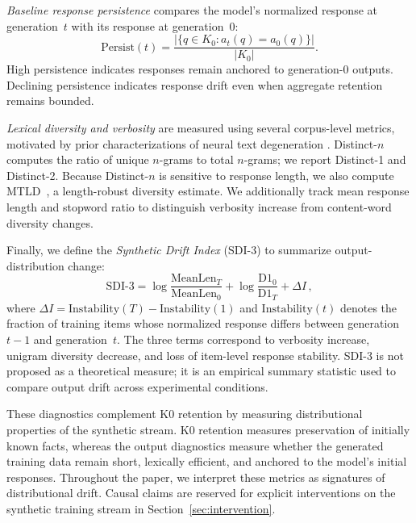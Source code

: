 \documentclass[a4paper,fleqn]{cas-dc}
\begin{document}
\textit{Baseline response persistence} compares the model's normalized response
at generation~$t$ with its response at generation~0:
\begin{equation}\label{eq:persistence}
    \mathrm{Persist}(t) =
    \frac{|\{q \in K_0 : a_t(q) = a_0(q)\}|}{|K_0|}.
\end{equation}
High persistence indicates responses remain anchored to generation-0 outputs.
Declining persistence indicates response drift even when aggregate retention
remains bounded.

\textit{Lexical diversity and verbosity} are measured using several corpus-level
metrics, motivated by prior characterizations of neural text degeneration
\citep{holtzman2020}. Distinct-$n$~\citep{li2016} computes the ratio of unique
$n$-grams to
total $n$-grams; we report Distinct-1 and Distinct-2. Because Distinct-$n$ is
sensitive to response length, we also compute
MTLD~\citep{mccarthy2010}, a length-robust diversity estimate. We additionally
track mean response length and stopword ratio to distinguish verbosity increase
from content-word diversity changes.

Finally, we define the \textit{Synthetic Drift Index} (SDI-3) to summarize
output-distribution change:
\begin{equation}\label{eq:sdi}
    \mathrm{SDI\text{-}3} =
    \log\frac{\mathrm{MeanLen}_T}{\mathrm{MeanLen}_0}
    + \log\frac{\mathrm{D1}_0}{\mathrm{D1}_T}
    + \Delta I\,,
\end{equation}
where $\Delta I = \mathrm{Instability}(T) -
\mathrm{Instability}(1)$ and $\mathrm{Instability}(t)$ denotes the fraction of
training items whose normalized response differs between generation~$t{-}1$ and
generation~$t$. The three terms correspond to verbosity increase, unigram
diversity decrease, and loss of item-level response stability. SDI-3 is not
proposed as a theoretical measure; it is an empirical summary statistic used to
compare output drift across experimental conditions.

These diagnostics complement K0 retention by measuring distributional properties
of the synthetic stream. K0 retention measures preservation of initially known
facts, whereas the output diagnostics measure whether the generated training
data remain short, lexically efficient, and anchored to the model's initial
responses. Throughout the paper, we interpret these metrics as signatures of
distributional drift. Causal claims are reserved for explicit interventions on
the synthetic training stream in Section~\ref{sec:intervention}.
\end{document}
